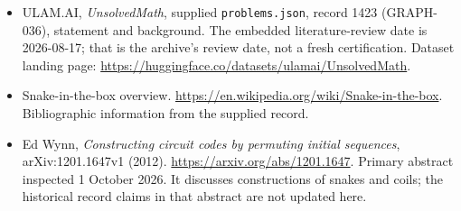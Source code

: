 \documentclass[11pt,a4paper]{article}
\begin{document}
{\small

\begin{itemize}

\item[\hypertarget{source:1423:1}{S1}] ULAM.AI, \emph{UnsolvedMath}, supplied \texttt{problems.json}, record 1423 (GRAPH-036), statement and background. The embedded literature-review date is 2026-08-17; that is the archive’s review date, not a fresh certification. Dataset landing page: \url{https://huggingface.co/datasets/ulamai/UnsolvedMath}.

\item[\hypertarget{source:1423:2}{S2}] Snake-in-the-box overview. \url{https://en.wikipedia.org/wiki/Snake-in-the-box}. Bibliographic information from the supplied record.


\item[E1] Ed Wynn, \emph{Constructing circuit codes
by permuting initial sequences}, arXiv:1201.1647v1 (2012).
\url{https://arxiv.org/abs/1201.1647}. Primary abstract inspected
1 October 2026. It discusses constructions of snakes and coils;
the historical record claims in that abstract are not updated here.

\end{itemize}

}

\label{end:1423}
\end{document}
